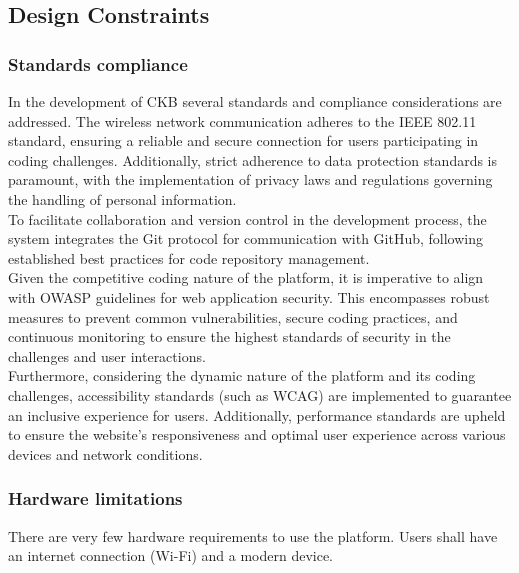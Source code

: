 \vspace{50pt}

\subsection{Design Constraints}

\vspace{20pt}

\subsubsection{Standards compliance}
In the development of CKB several standards and compliance considerations are addressed. The wireless network communication adheres to the IEEE 802.11 standard, ensuring a reliable and secure connection for users participating in coding challenges. Additionally, strict adherence to data protection standards is paramount, with the implementation of privacy laws and regulations governing the handling of personal information.
\\To facilitate collaboration and version control in the development process, the system integrates the Git protocol for communication with GitHub, following established best practices for code repository management.
\\Given the competitive coding nature of the platform, it is imperative to align with OWASP guidelines for web application security. This encompasses robust measures to prevent common vulnerabilities, secure coding practices, and continuous monitoring to ensure the highest standards of security in the challenges and user interactions.
\\Furthermore, considering the dynamic nature of the platform and its coding challenges, accessibility standards (such as WCAG) are implemented to guarantee an inclusive experience for users. Additionally, performance standards are upheld to ensure the website's responsiveness and optimal user experience across various devices and network conditions. 

\vspace{20pt}

\subsubsection{Hardware limitations}

There are very few hardware requirements to use the platform. Users shall have an internet connection (Wi-Fi) and a modern device. 

